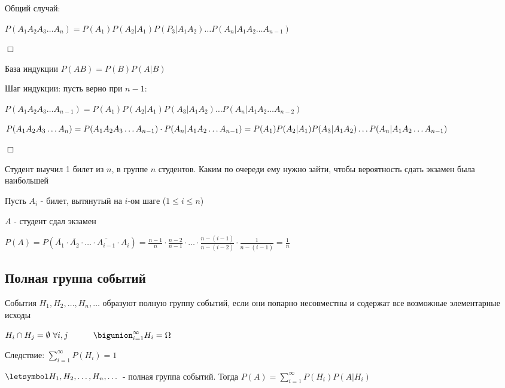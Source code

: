 \documentclass[12pt]{article}
\begin{document}
    Общий случай:

    $P(A_1 A_2 A_3 \dots A_n) = P(A_1) P(A_2 | A_1) P(P_3 | A_1 A_2) \dots P(A_n | A_1 A_2 \dots A_{n - 1})$

    \begin{tcolorbox}
        $\Box$

        База индукции $P(AB) = P(B) P(A|B)$

        Шаг индукции: пусть верно при $n - 1$:

        $P(A_1 A_2 A_3 \dots A_{n - 1}) = P(A_1) P(A_2 | A_1) P(A_3 | A_1 A_2) \dots P(A_n | A_1 A_2 \dots A_{n - 2})$

        $P(A_1 A_2 A_3 \dots A_n) = P(A_1 A_2 A_3 \dots A_{n - 1}) \cdot P(A_n | A_1 A_2 \dots A_{n - 1}) = \\
        P(A_1) P(A_2 | A_1) P(A_3 | A_1 A_2) \dots P(A_n | A_1 A_2 \dots A_{n - 1})$

        $\Box$
    \end{tcolorbox}


    \Ex Студент выучил 1 билет из $n$, в группе $n$ студентов. Каким по очереди ему нужно зайти, чтобы вероятность сдать экзамен была наибольшей

    Пусть $A_i$ - билет, вытянутый на $i$-ом шаге ($1 \leq i \leq n$)

    $A$ - студент сдал экзамен

    $P(A) = P(\overline{A_1} \cdot \overline{A_2} \cdot \dots \cdot \overline{A_{i - 1}} \cdot A_i) = \frac{n - 1}{n} \cdot \frac{n - 2}{n - 1} \cdot \dots \cdot \frac{n - (i - 1)}{n - (i - 2)} \cdot \frac{1}{n - (i - 1)} = \frac{1}{n}$

    \hypertarget{completegroupofevents}{}

    \subsection{Полная группа событий}

    \Def События $H_1, H_2, \dots, H_n, \dots$ образуют полную группу событий, если они попарно несовместны и содержат все возможные элементарные исходы

    $H_i \cap H_j = \emptyset \ \forall i, j \quad\quad\quad \bigunion_{i = 1}^{\infty} H_i = \Omega$

    Следствие: $\sum_{i = 1}^\infty P(H_i) = 1$

    \hypertarget{formulaofcompleteprobability}{}

    \begin{MyTheorem}
         $\letsymbol H_1, H_2, \dots, H_n, \dots$ - полная группа событий. Тогда $P(A) = \sum_{i = 1}^\infty P(H_i) P(A | H_i)$
    \end{MyTheorem}
\end{document}
